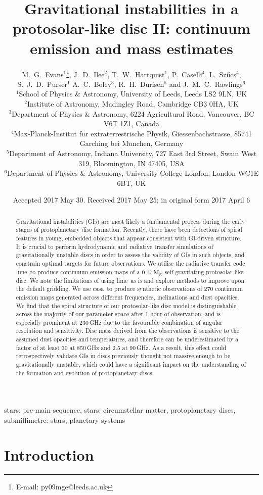 \documentclass[fleqn,usenatbib]{mnras}
\title[GIs in a protosolar-like disc II]{Gravitational instabilities in a protosolar-like disc II: continuum emission and mass estimates}
\author[M. G. Evans et al.]{
M.\ G.\ Evans$^{1}$\thanks{E-mail: py09mge@leeds.ac.uk},
J.\ D.\ Ilee$^{2}$, 
T.\ W.\ Hartquist$^{1}$, 
P.\ Caselli$^{4}$, 
L.\ Sz\H{u}cs$^{4}$, 
\newauthor
S.\ J.\ D.\ Purser$^{1}$
A.\ C.\ Boley$^{3}$,
R.\ H.\ Durisen$^{5}$ and
J.\ M.\ C.\ Rawlings$^{6}$
\\
$^{1}$School of Physics \& Astronomy, University of Leeds, Leeds LS2 9LN, UK\\
$^{2}$Institute of Astronomy, Madingley Road, Cambridge CB3 0HA, UK\\
$^{3}$Department of Physics \& Astronomy, 6224 Agricultural Road, Vancouver, BC V6T 1Z1, Canada\\
$^{4}$Max-Planck-Institut f$\ddot{u}$r extraterrestrische Physik, Giessenbachstrasse, 85741 Garching bei M$\ddot{u}$nchen, Germany\\
$^{5}$Department of Astronomy, Indiana University, 727 East 3rd Street, Swain West 319, Bloomington, IN 47405, USA\\
$^{6}$Department of Physics \& Astronomy, University College London, London WC1E 6BT, UK
}
\date{Accepted 2017 May 30. Received 2017 May 25; in original form 2017 April 6}
\newcommand{\lime}{{\sc lime}}
\newcommand{\casa}{{\sc casa}}
\begin{document}
\label{firstpage}
\pagerange{\pageref{firstpage}--\pageref{lastpage}}
\maketitle

\begin{abstract}
Gravitational instabilities (GIs) are most likely a fundamental process during the early stages of protoplanetary disc formation. Recently, there have been detections of spiral features in young, embedded objects that appear consistent with GI-driven structure. It is crucial to perform hydrodynamic and radiative transfer simulations of gravitationally unstable discs in order to assess the validity of GIs in such objects, and constrain optimal targets for future observations. We utilise the radiative transfer code \lime\ to produce continuum emission maps of a $0.17\,\mathrm{M}_{\odot}$ self-gravitating protosolar-like disc. We note the limitations of using \lime\ as is and explore methods to improve upon the default gridding. We use \casa\ to produce synthetic observations of 270 continuum emission maps generated across different frequencies, inclinations and dust opacities. We find that the spiral structure of our protosolar-like disc model is distinguishable across the majority of our parameter space after 1 hour of observation, and is especially prominent at 230\,GHz due to the favourable combination of angular resolution and sensitivity. Disc mass derived from the observations is sensitive to the assumed dust opacities and temperatures, and therefore can be underestimated by a factor of at least 30 at 850\,GHz and 2.5 at 90\,GHz. As a result, this effect could retrospectively validate GIs in discs previously thought not massive enough to be gravitationally unstable, which could have a significant impact on the understanding of the formation and evolution of protoplanetary discs.

\end{abstract}

\begin{keywords}
stars: pre-main-sequence, stars: circumstellar matter, protoplanetary
discs, submillimetre: stars, planetary systems
\end{keywords}

\section{Introduction}
\end{document}
